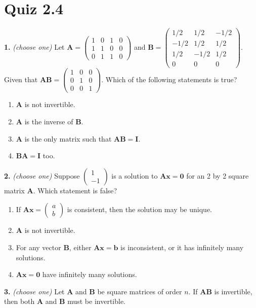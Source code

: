\documentclass[10pt,a4paper]{article}
\begin{document}
\section{Quiz 2.4}
\textbf{1.} \textit{(choose one)} Let \(\mathbf{A}=\begin{pmatrix}1&0&1&0\\1&1&0&0\\0&1&1&0\end{pmatrix}\) and \(\mathbf{B}=\begin{pmatrix}1/2&1/2&-1/2\\-1/2&1/2&1/2\\1/2&-1/2&1/2\\0&0&0\end{pmatrix}\). Given that \(\mathbf{AB}=\begin{pmatrix}1&0&0\\0&1&0\\0&0&1\end{pmatrix}\). Which of the following statements is true?

\begin{enumerate}[label=(\Alph*)]
\item \(\mathbf{A}\) is not invertible.
\item \(\mathbf{A}\) is the inverse of \(\mathbf{B}\).
\item \(\mathbf{A}\) is the only matrix such that \(\mathbf{AB=I}\).
\item \(\mathbf{BA=I}\) too.
\end{enumerate}
\smallskip
\textbf{2.} \textit{(choose one)} Suppose \(\begin{pmatrix}1\\-1\end{pmatrix}\) is a solution to \(\mathbf{Ax=0}\) for an 2 by 2 square matrix \(\mathbf{A}\). Which statement is false?

\begin{enumerate}[label=(\Alph*)]
\item If \(\mathbf{Ax=}\begin{pmatrix}a\\b\end{pmatrix}\) is consistent, then the solution may be unique.
\item \(\mathbf{A}\) is not invertible.
\item For any vector \(\mathbf{B}\), either \(\mathbf{Ax=b}\) is inconsistent, or it has infinitely many solutions.
\item \(\mathbf{Ax=0}\) have infinitely many solutions.
\end{enumerate}
\smallskip
\textbf{3.} \textit{(choose one)} Let \(\mathbf{A}\) and \(\mathbf{B}\)  be square matrices of order \(n\). If \(\mathbf{A}\mathbf{B}\) is invertible, then both \(\mathbf{A}\) and \(\mathbf{B}\) must be invertible.
\end{document}
